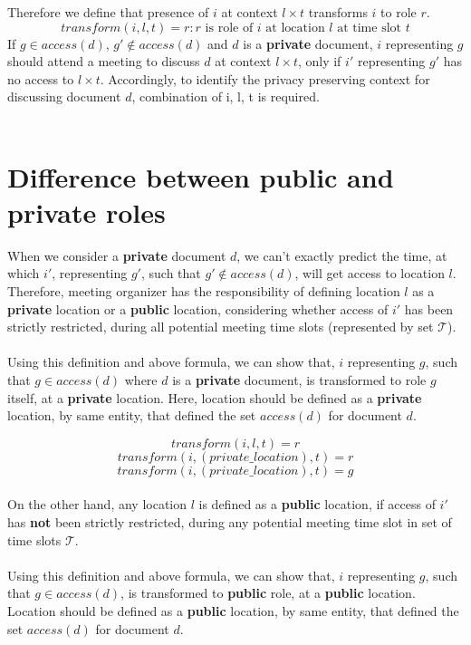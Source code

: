 Therefore we define that presence of $i$ at context $l \times t$ transforms $i$ to role $r$.
\[ transform(i, l, t) = r : r \text{ is role of } i \text{ at location } l \text{ at time slot } t \] 
\noindent
If $g \in access(d)$, $g' \notin access(d)$ and $d$ is a \textbf{private} document, $i$ representing $g$ should attend a meeting to discuss $d$ at context $l \times t$, only if $i'$ representing $g'$ has no access to $l \times t$. Accordingly, to identify the privacy preserving context for discussing document $d$, combination of i, l, t is required.\\ \\



\section{Difference between public and private roles}
When we consider a \textbf{private} document $d$, we can't exactly predict the time, at which $i'$, representing $g'$, such that $g' \notin access(d)$, will get access to location $l$. 
Therefore, meeting organizer has the responsibility of defining location $l$ as a \textbf{private} location or a \textbf{public} location, considering whether access of $i'$ has been strictly restricted, during all potential meeting time slots (represented by set $\mathcal{T}$).\\ \\
Using this definition and above formula, we can show that, $i$ representing $g$, such that $g \in access(d)$ where $d$ is a \textbf{private} document, is transformed to role $g$ itself, at a \textbf{private} location. 
Here, location should be defined as a \textbf{private} location, by same entity, that defined the set $access(d)$ for document $d$.

\[ transform(i, l, t) = r \]
\[ transform(i, (private\_location), t) = r \]
\[ transform(i, (private\_location), t) = g \] \\

\noindent
On the other hand, any location $l$ is defined as a \textbf{public} location, if access of $i'$ has \textbf{not} been strictly restricted, during any potential meeting time slot in set of time slots $\mathcal{T}$.\\ \\
Using this definition and above formula, we can show that, $i$ representing $g$, such that $g \in access(d)$, is transformed to \textbf{public} role, at a \textbf{public} location.
Location should be defined as a \textbf{public} location, by same entity, that defined the set $access(d)$ for document $d$.

